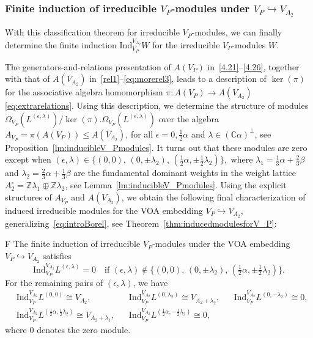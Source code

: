 \documentclass[12pt,a4paper,reqno]{amsart}
\numberwithin{equation}{section}
\numberwithin{equation}{section}
\theoremstyle{definition}
\newcommand{\Z}{\mathbb{Z}}
\def \ra {\rightarrow}
\def \C {\mathbb{C}}
\def\la{\lambda}
\def \al{\alpha}
\def\hr{\hookrightarrow}
\def \b {\beta}
\def \op {\oplus}
\def\Ind{\mathrm{Ind}}
\def\Om{\Omega}
\def\Ind{\mathrm{Ind}}
\begin{document}
\subsubsection{Finite induction of irreducible $V_P$-modules under $V_P\hr V_{A_2}$}

With this classification theorem for irreducible $V_P$-modules, we can finally determine the finite induction $\mathrm{Ind}_{V_P}^{V_{A_2}}W$ for the irreducible $V_{P}$-modules $W$.  

The generators-and-relations presentation of $A(V_P)$ in~\eqref{4.21}--\eqref{4.26}, together with that of $A(V_{A_2})$ in~\eqref{rel1}--\eqref{eq:morerel3}, leads to a description of $\ker(\pi)$ for the associative algebra homomorphism 
$\pi: A(V_P)\ra A(V_{A_2})$ \eqref{eq:extrarelations}. Using this description, we determine the structure of modules
$\Om_{V_P}(L^{(\epsilon,\lambda)})/\ker(\pi).\Om_{V_P}(L^{(\epsilon,\la)})$ over the algebra $A_{V_P}=\pi(A(V_P))\leq A(V_{A_2})$, for all $\epsilon = 0, \tfrac{1}{2}\alpha$ and $\lambda \in (\C\alpha)^\perp$, see Proposition~\ref{lm:inducibleV_Pmodules}. It turns out that these modules are zero except when $ (\epsilon,\lambda)\in \{(0,0),\,(0,\pm \lambda_2),\, (\tfrac{1}{2}\alpha,\pm \tfrac{1}{2}\lambda_2)\}, $
where $\la_1=\frac{1}{3}\al+\frac{2}{3}\b$ and $\la_2=\frac{2}{3}\al+\frac{1}{3}\b$ are the fundamental dominant weights in the weight lattice $A_2^\circ=\Z\la_1\op \Z \la_2$, see Lemma~\ref{lm:inducibleV_Pmodules}.
 Using the explicit structures of $A_{V_P}$ and $A(V_{A_2})$, we obtain the following final characterization of induced irreducible modules for the VOA embedding $V_P \hookrightarrow V_{A_2}$, generalizing~\eqref{eq:introBorel}, see Theorem~\ref{thm:inducedmodulesforV_P}:

\begin{customthm}{F}\label{main:F}
		The finite induction of irreducible $V_P$-modules under the VOA embedding $V_P \hookrightarrow V_{A_2}$ satisfies
\[
\Ind^{V_{A_2}}_{V_P} L^{(\epsilon,\lambda)} = 0 \quad 
\text{if } (\epsilon,\lambda)\notin \{(0,0),\,(0,\pm \lambda_2),\, (\tfrac{1}{2}\alpha,\pm \tfrac{1}{2}\lambda_2)\}.
\]
For the remaining pairs of $(\epsilon,\la)$, we have 
\begin{align*}
	&\Ind^{V_{A_2}}_{V_P}L^{(0,0)} \cong V_{A_2}, 
	&& \Ind^{V_{A_2}}_{V_P}L^{(0, \lambda_2)} \cong V_{A_2+\lambda_2}, 
	&& \Ind^{V_{A_2}}_{V_P}L^{(0,- \lambda_2)} \cong 0,\\
	&\Ind^{V_{A_2}}_{V_P}L^{(\frac{1}{2}\alpha, \frac{1}{2}\lambda_2)} \cong  V_{A_2+\lambda_1}, 
	&& \Ind^{V_{A_2}}_{V_P}L^{(\frac{1}{2}\alpha, -\frac{1}{2}\lambda_2)} \cong  0,
\end{align*}
where $0$ denotes the zero module. 
\end{customthm}
\end{document}
